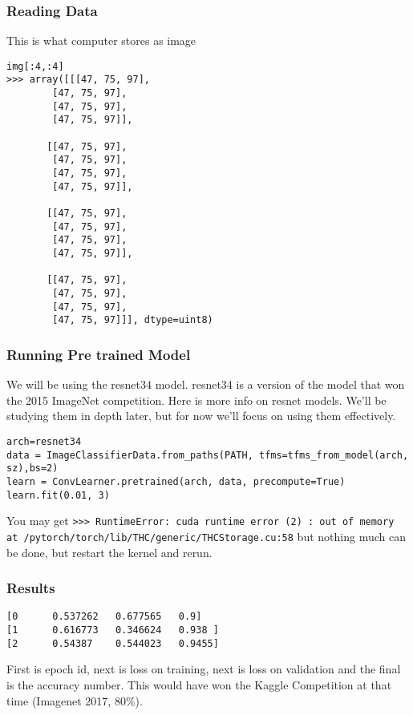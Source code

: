 \begin{frame}[fragile] \frametitle{Reading Data}
This is what computer stores as image
\begin{lstlisting}
img[:4,:4]
>>> array([[[47, 75, 97],
        [47, 75, 97],
        [47, 75, 97],
        [47, 75, 97]],

       [[47, 75, 97],
        [47, 75, 97],
        [47, 75, 97],
        [47, 75, 97]],

       [[47, 75, 97],
        [47, 75, 97],
        [47, 75, 97],
        [47, 75, 97]],

       [[47, 75, 97],
        [47, 75, 97],
        [47, 75, 97],
        [47, 75, 97]]], dtype=uint8)
\end{lstlisting}

\end{frame}

\begin{frame}[fragile] \frametitle{Running Pre trained Model}
We will be using the resnet34 model. resnet34 is a version of the model that won the 2015 ImageNet competition. Here is more info on resnet models. We'll be studying them in depth later, but for now we'll focus on using them effectively.
\begin{lstlisting}
arch=resnet34
data = ImageClassifierData.from_paths(PATH, tfms=tfms_from_model(arch, sz),bs=2)
learn = ConvLearner.pretrained(arch, data, precompute=True)
learn.fit(0.01, 3)
\end{lstlisting}
You may get \lstinline|>>> RuntimeError: cuda runtime error (2) : out of memory at /pytorch/torch/lib/THC/generic/THCStorage.cu:58| but nothing much can be done, but restart the kernel and rerun.
\end{frame}

\begin{frame}[fragile] \frametitle{Results}

\begin{lstlisting}
[0      0.537262   0.677565   0.9]
[1      0.616773   0.346624   0.938 ]
[2      0.54387    0.544023   0.9455]
\end{lstlisting}
First is epoch id, next is loss on training, next is loss on validation and the final is the accuracy number. This would have won the Kaggle Competition at that time (Imagenet 2017, 80\%).
\end{frame}

